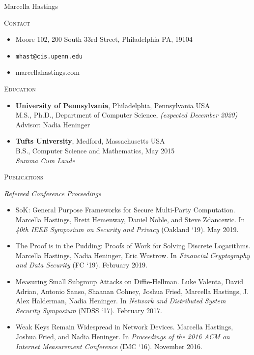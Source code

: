 \documentclass{article}
\begin{document}
Marcella Hastings

\hrulefill

\textsc{Contact}
\begin{itemize}[label={},noitemsep, topsep=0pt]
  \item Moore 102, 200 South 33rd Street, Philadelphia PA, 19104
  \item \texttt{mhast@cis.upenn.edu}
  \item marcellahastings.com\\
\end{itemize}

\textsc{Education}
\begin{itemize}[label={}, topsep=0pt]
  \item \textbf{University of Pennsylvania}, Philadelphia, Pennsylvania USA \\
    M.S., Ph.D., Department of Computer Science, \textit{(expected December 2020)}\\
    Advisor: Nadia Heninger 
    
  \item \textbf{Tufts University}, Medford, Massachusetts USA \\
    B.S., Computer Science and Mathematics, May 2015 \\
    \textit{Summa Cum Laude} \\
\end{itemize}

\textsc{Publications}

\textit{Refereed Conference Proceedings}
\begin{itemize}[label={}]
\item SoK: General Purpose Frameworks for Secure Multi-Party Computation. 
Marcella Hastings, Brett Hemenway, Daniel Noble, and Steve Zdancewic.
In \textit{40th IEEE Symposium on Security and Privacy} (Oakland `19). May 2019.
\item The Proof is in the Pudding: Proofs of Work for Solving Discrete Logarithms.
Marcella Hastings, Nadia Heninger, Eric Wustrow.
In \emph{Financial Cryptography and Data Security} (FC `19). February 2019.
\item Measuring Small Subgroup Attacks on Diffie-Hellman. 
Luke Valenta, David Adrian, Antonio Sanso, Shaanan Cohney, Joshua Fried, Marcella Hastings, J. Alex Halderman, Nadia Heninger. 
In \textit{Network and Distributed System Security Symposium} (NDSS `17). February 2017.
\item Weak Keys Remain Widespread in Network Devices. 
Marcella Hastings, Joshua Fried, and Nadia Heninger. 
In \textit{Proceedings of the 2016 ACM on Internet Measurement Conference} (IMC `16). November 2016.
\end{itemize}
\end{document}
